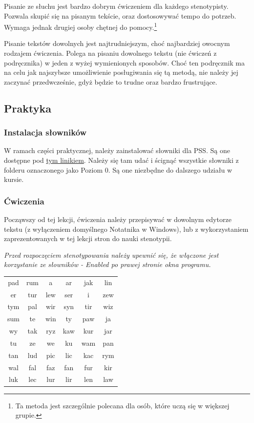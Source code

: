 \documentclass[12p, oneside]{book}
\begin{document}
Pisanie ze słuchu jest bardzo dobrym ćwiczeniem dla każdego stenotypisty. Pozwala skupić się na pisanym tekście, oraz dostosowywać tempo do potrzeb. Wymaga jednak drugiej osoby chętnej do pomocy.\footnote{Ta metoda jest szczególnie polecana dla osób, które uczą się w większej grupie.}

Pisanie tekstów dowolnych jest najtrudniejszym, choć najbardziej owocnym rodzajem ćwiczenia. Polega na pisaniu dowolnego tekstu (nie ćwiczeń z podręcznika) w jeden z wyżej wymienionych sposobów. Choć ten podręcznik ma na celu jak najszybsze umożliwienie posługiwania się tą metodą, nie należy jej zaczynać przedwcześnie, gdyż będzie to trudne oraz bardzo frustrujące.

\subsection*{Praktyka}
\label{prakt:3}

\subsubsection{Instalacja słowników}

W ramach części praktycznej, należy zainstalować słowniki dla PSS. Są one dostępne pod \href{https://github.com/bspat/Stenotypia-polska/tree/main/system/slowniki}{tym linikiem}. Należy się tam udać i ścignąć wszystkie słowniki z folderu oznaczonego jako Poziom 0. Są one niezbędne do dalszego udziału w kursie.

\subsubsection{Ćwiczenia}

Począwszy od tej lekcji, ćwiczenia należy przepisywać w dowolnym edytorze tekstu (z wyłączeniem domyślnego Notatnika w Windows), lub z wykorzystaniem zaprezentowanych w tej lekcji stron do nauki stenotypii.

\emph{Przed rozpoczęciem stenotypowania należy upewnić się, że włączone jest korzystanie ze słowników - Enabled po prawej stronie okna programu.}

\LARGE
\begin{tabular}{c c c c c c}
	pad & rum & a & ar & jak & lin \\
	er & tur & lew & ser & i & zew \\
	tym & pal & wir & syn & tir & wiz \\
	sum & te & win & ty & paw & ja \\
	wy & tak & ryz & kaw & kur & jar \\
	tu & ze & we & ku & wam & pan \\
	tan & lud & pic & lic & kac & rym \\
	wal & fal & faz & fan & fur & kir \\
	luk & lec & lur & lir & len & law \\
\end{tabular}
\normalsize
\end{document}
